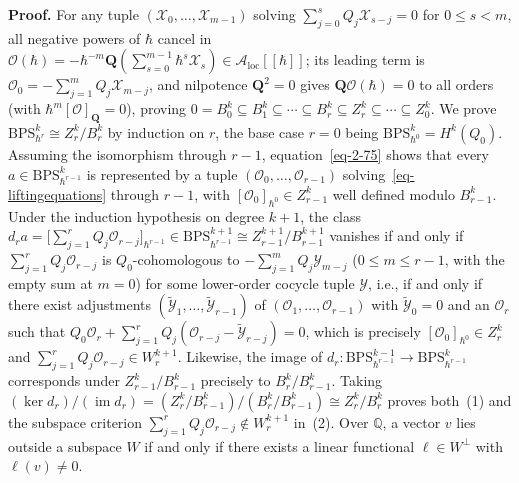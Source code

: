 \documentclass[11pt]{article}
\numberwithin{equation}{section}
\numberwithin{figure}{section}
\numberwithin{table}{section}
\begin{document}
\begin{proofbox}
\textbf{Proof.} For any tuple $(\mathcal X_0,\ldots,\mathcal X_{m-1})$ solving $\sum_{j=0}^s Q_j\mathcal X_{s-j}=0$ for $0\le s<m$, all negative powers of $\hbar$ cancel in $\mathcal O(\hbar)=-\hbar^{-m}\mathbf Q(\sum_{s=0}^{m-1}\hbar^s\mathcal X_s)\in\mathcal A_{\mathrm{loc}}[[\hbar]]$; its leading term is $\mathcal O_0=-\sum_{j=1}^m Q_j\mathcal X_{m-j}$, and nilpotence $\mathbf Q^2=0$ gives $\mathbf Q\mathcal O(\hbar)=0$ to all orders (with $\hbar^m[\mathcal O]_{\mathbf Q}=0$), proving $0=B_0^k\subseteq B_1^k\subseteq\cdots\subseteq B_r^k\subseteq Z_r^k\subseteq\cdots\subseteq Z_0^k$. We prove $\mathrm{BPS}_{\hbar^r}^k\cong Z_r^k/B_r^k$ by induction on $r$, the base case $r=0$ being $\mathrm{BPS}_{\hbar^0}^k=H^k(Q_0)$. Assuming the isomorphism through $r-1$, equation~\eqref{eq-2-75} shows that every $a\in\mathrm{BPS}_{\hbar^{r-1}}^k$ is represented by a tuple $(\mathcal O_0,\ldots,\mathcal O_{r-1})$ solving~\eqref{eq-liftingequations} through $r-1$, with $[\mathcal O_0]_{\hbar^0}\in Z_{r-1}^k$ well defined modulo $B_{r-1}^k$. Under the induction hypothesis on degree $k+1$, the class $d_r a=\bigl[\sum_{j=1}^r Q_j\mathcal O_{r-j}\bigr]_{\hbar^{r-1}}\in\mathrm{BPS}_{\hbar^{r-1}}^{k+1}\cong Z_{r-1}^{k+1}/B_{r-1}^{k+1}$ vanishes if and only if $\sum_{j=1}^r Q_j\mathcal O_{r-j}$ is $Q_0$-cohomologous to $-\sum_{j=1}^m Q_j\mathcal Y_{m-j}$ ($0\le m\le r-1$, with the empty sum at $m=0$) for some lower-order cocycle tuple $\mathcal Y$, i.e., if and only if there exist adjustments $(\widetilde{\mathcal Y}_1,\ldots,\widetilde{\mathcal Y}_{r-1})$ of $(\mathcal O_1,\ldots,\mathcal O_{r-1})$ with $\widetilde{\mathcal Y}_0=0$ and an $\mathcal O_r$ such that $Q_0\mathcal O_r+\sum_{j=1}^r Q_j(\mathcal O_{r-j}-\widetilde{\mathcal Y}_{r-j})=0$, which is precisely $[\mathcal O_0]_{\hbar^0}\in Z_r^k$ and $\sum_{j=1}^r Q_j\mathcal O_{r-j}\in W_r^{k+1}$. Likewise, the image of $d_r:\mathrm{BPS}_{\hbar^{r-1}}^{k-1}\to\mathrm{BPS}_{\hbar^{r-1}}^k$ corresponds under $Z_{r-1}^k/B_{r-1}^k$ precisely to $B_r^k/B_{r-1}^k$. Taking $(\ker d_r)/(\operatorname{im}d_r)=(Z_r^k/B_{r-1}^k)/(B_r^k/B_{r-1}^k)\cong Z_r^k/B_r^k$ proves both~(1) and the subspace criterion $\sum_{j=1}^r Q_j\mathcal O_{r-j}\notin W_r^{k+1}$ in~(2). Over $\mathbb Q$, a vector $v$ lies outside a subspace $W$ if and only if there exists a linear functional $\ell\in W^\perp$ with $\ell(v)\ne0$.~\hfill\qedsymbol
\end{proofbox}
\end{document}
